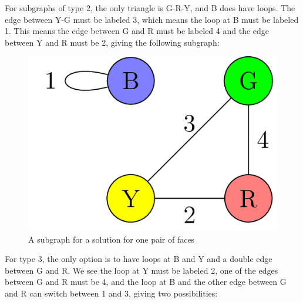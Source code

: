 \documentclass[10pt,]{book}
\theoremstyle{plain}
\theoremstyle{definition}
\theoremstyle{definition}
\theoremstyle{definition}
\theoremstyle{definition}
\numberwithin{equation}{section}
\begin{document}
%
\par
\hypertarget{p-68}{}%
For subgraphs of type 2, the only triangle is G-R-Y, and B does have loops. The edge between Y-G must be labeled 3, which means the loop at B must be labeled 1. This means the edge between G and R must be labeled 4 and the edge between Y and R must be 2, giving the following subgraph:%
\begin{figure}
\centering
\includegraphics[width=0.4\linewidth]{images/InstantInsanityImpossibleFirst.png}
\caption{A subgraph for a solution for one pair of faces\label{fig_impossible_first}}
\end{figure}
\hypertarget{p-69}{}%
For type 3, the only option is to have loops at B and Y and a double edge between G and R. We see the loop at Y must be labeled 2, one of the edges between G and R must be 4, and the loop at B and the other edge between G and R can switch between 1 and 3, giving two possibilities:%
\end{document}
